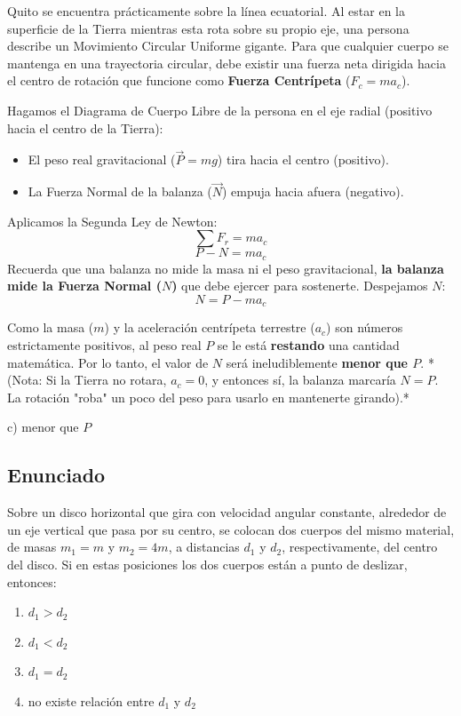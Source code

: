 \documentclass[12pt, a4paper]{article}
\begin{document}
Quito se encuentra prácticamente sobre la línea ecuatorial. Al estar en la superficie de la Tierra mientras esta rota sobre su propio eje, una persona describe un Movimiento Circular Uniforme gigante. 
Para que cualquier cuerpo se mantenga en una trayectoria circular, debe existir una fuerza neta dirigida hacia el centro de rotación que funcione como \textbf{Fuerza Centrípeta} ($F_c = m a_c$).

Hagamos el Diagrama de Cuerpo Libre de la persona en el eje radial (positivo hacia el centro de la Tierra):
\begin{itemize}
    \item El peso real gravitacional ($\vec{P} = mg$) tira hacia el centro (positivo).
    \item La Fuerza Normal de la balanza ($\vec{N}$) empuja hacia afuera (negativo).
\end{itemize}

Aplicamos la Segunda Ley de Newton:
$$ \sum F_r = m a_c $$
$$ P - N = m a_c $$
Recuerda que una balanza no mide la masa ni el peso gravitacional, \textbf{la balanza mide la Fuerza Normal ($N$)} que debe ejercer para sostenerte. Despejamos $N$:
$$ N = P - m a_c $$

Como la masa ($m$) y la aceleración centrípeta terrestre ($a_c$) son números estrictamente positivos, al peso real $P$ se le está \textbf{restando} una cantidad matemática. Por lo tanto, el valor de $N$ será ineludiblemente \textbf{menor que $P$}.
*(Nota: Si la Tierra no rotara, $a_c = 0$, y entonces sí, la balanza marcaría $N = P$. La rotación "roba" un poco del peso para usarlo en mantenerte girando).*

\begin{tcolorbox}[colback=green!5!white, colframe=green!50!black, title=Respuesta Final]
\centering \Large c) menor que $P$
\end{tcolorbox}

\newpage

\subsection*{Enunciado}
Sobre un disco horizontal que gira con velocidad angular constante, alrededor de un eje vertical que pasa por su centro, se colocan dos cuerpos del mismo material, de masas $m_1 = m$ y $m_2 = 4m$, a distancias $d_1$ y $d_2$, respectivamente, del centro del disco. Si en estas posiciones los dos cuerpos están a punto de deslizar, entonces:
\begin{enumerate}[label=\alph*)]
    \item $d_1 > d_2$
    \item $d_1 < d_2$
    \item $d_1 = d_2$
    \item no existe relación entre $d_1$ y $d_2$
\end{enumerate}
\end{document}
